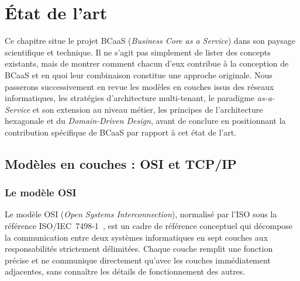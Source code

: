 %

\chapter{État de l'art}
\label{chap:etat-de-lart}

Ce chapitre situe le projet BCaaS (\textit{Business Core as a Service}) dans son paysage
scientifique et technique. Il ne s'agit pas simplement de lister des concepts existants,
mais de montrer comment chacun d'eux contribue à la conception de BCaaS et en quoi leur
combinaison constitue une approche originale. Nous passerons successivement en revue les
modèles en couches issus des réseaux informatiques, les stratégies d'architecture
multi-tenant, le paradigme \textit{as-a-Service} et son extension au niveau métier, les
principes de l'architecture hexagonale et du \textit{Domain-Driven Design}, avant de
conclure en positionnant la contribution spécifique de BCaaS par rapport à cet état de
l'art.

\section{Modèles en couches : OSI et TCP/IP}
\label{sec:osi-tcpip}

\subsection{Le modèle OSI}
\label{subsec:osi}

Le modèle OSI (\textit{Open Systems Interconnection}), normalisé par l'ISO sous la
référence ISO/IEC~7498-1~\cite{iso7498}, est un cadre de référence conceptuel qui décompose
la communication entre deux systèmes informatiques en sept couches aux responsabilités
strictement délimitées. Chaque couche remplit une fonction précise et ne communique
directement qu'avec les couches immédiatement adjacentes, sans connaître les détails de
fonctionnement des autres.

